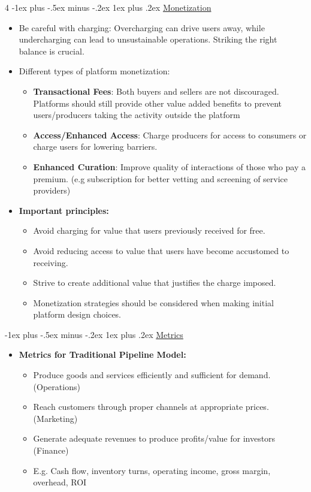 \documentclass[10pt, landscape]{article}
\makeatletter
\renewcommand{\subsubsection}{\@startsection{subsubsection}{3}{0mm}%
  {-1ex plus -.5ex minus -.2ex}%
  {1ex plus .2ex}%
{\normalfont\small\bfseries}}%
\makeatother
\begin{document}
\begin{multicols*}{4}
    \subsubsection{\underline{Monetization}}
    \begin{itemize}
      \item Be careful with charging: Overcharging can drive users away, while undercharging can lead to unsustainable operations. Striking the right balance is crucial.
     \item Different types of platform monetization:
        \begin{itemize}
          \item \textbf{Transactional Fees}: Both buyers and sellers are not discouraged. Platforms should still provide other value added benefits to prevent users/producers taking the activity outside the platform
          \item \textbf{Access/Enhanced Access}: Charge producers for access to consumers or charge users for lowering barriers.
          \item \textbf{Enhanced Curation}: Improve quality of interactions of those who pay a premium. (e.g subscription for better vetting and screening of service providers)
        \end{itemize}

      \item \textbf{Important principles:}
        \begin{itemize}
          \item Avoid charging for value that users previously received for free.
          \item Avoid reducing access to value that users have become accustomed to receiving.
          \item Strive to create additional value that justifies the charge imposed.
          \item Monetization strategies should be considered when making initial platform design choices.
        \end{itemize}
    \end{itemize}

    \subsubsection{\underline{Metrics}}
    \begin{itemize}
      \item \textbf{Metrics for Traditional Pipeline Model:}
        \begin{itemize}
          \item Produce goods and services efficiently and sufficient for demand. (Operations)
          \item Reach customers through proper channels at appropriate prices. (Marketing)
          \item Generate adequate revenues to produce profits/value for investors (Finance)
          \item E.g. Cash flow, inventory turns, operating income, gross margin, overhead, ROI
        \end{itemize}


\end{itemize}
\end{multicols*}
\end{document}
